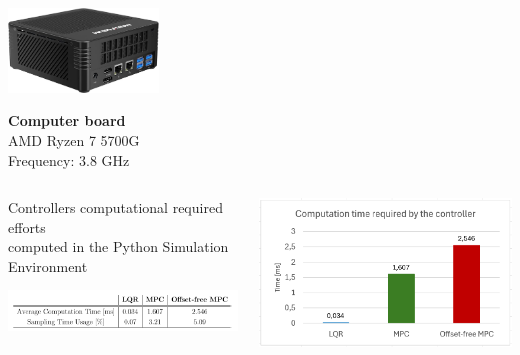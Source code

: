 \documentclass[9pt, aspectratio=169]{beamer}
\begin{document}
\begin{frame}
\begin{columns}
\begin{column}{0.22\textwidth}
\begin{block}{}
	\begin{center}
  		\includegraphics[width=0.3\textwidth]{PC} 
	\end{center}
\centering
\textbf{Computer board} \\
AMD Ryzen 7 5700G  \\
Frequency: 3.8 GHz 
\end{block}
\end{column}
\end{columns}

\vspace{0.4cm}
\begin{columns}
\begin{column}{0.6\textwidth}
\centering
Controllers computational required efforts \\
computed in the Python Simulation Environment
	\begin{center}
  		\includegraphics[width=1\textwidth]{Table_back} 
	\end{center}
\end{column}

\begin{column}{0.4\textwidth}
	\begin{center}
  		\includegraphics[width=1\textwidth]{Effort} 
	\end{center}
\end{column}
\end{columns}
\end{frame}
\end{document}
